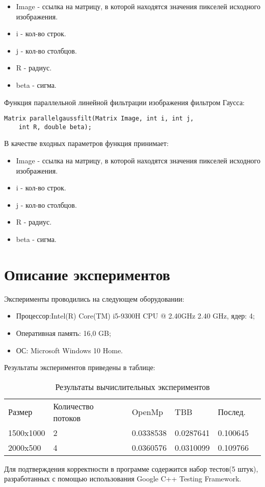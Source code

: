 \documentclass{report}
\begin{document}
\begin{itemize}
\item Image - ссылка на матрицу, в которой находятся значения пикселей исходного изображения.
\item i - кол-во строк.
\item j - кол-во столбцов.
\item R - радиус.
\item beta - сигма.
\end{itemize}
Функция параллельной линейной фильтрации изображения фильтром Гаусса:
\begin{lstlisting}
Matrix parallelgaussfilt(Matrix Image, int i, int j,
    int R, double beta);
\end{lstlisting}
В качестве входных параметров функция принимает:
\begin{itemize}
\item Image - ссылка на матрицу, в которой находятся значения пикселей исходного изображения.
\item i - кол-во строк.
\item j - кол-во столбцов.
\item R - радиус.
\item beta - сигма.
\end{itemize}
\newpage

\section*{Описание экспериментов}
Эксперименты проводились на следующем оборудовании: 
\begin{itemize}
\item Процессор:Intel(R) Core(TM) i5-9300H CPU @ 2.40GHz   2.40 GHz, ядер: 4;
\item Оперативная память: 16,0 GB;
\item ОС: Microsoft Windows 10 Home.
\end{itemize}
Результаты экспериментов приведены в таблице:
\begin{table}[!h]
\caption{Результаты вычислительных экспериментов}
\centering
\begin{tabular}{llllll}
Размер & Количество потоков & OpenMp & TBB & Послед. \\
1500x1000 & 2 & 0.0338538 & 0.0287641 & 0.100645\\
2000x500 & 4 & 0.0360576 & 0.0310099 & 0.109766\\
\end{tabular}
\end{table}
\par
Для подтверждения корректности в программе содержится набор тестов(5 штук), разработанных с помощью использования Google C++ Testing Framework.
\end{document}
